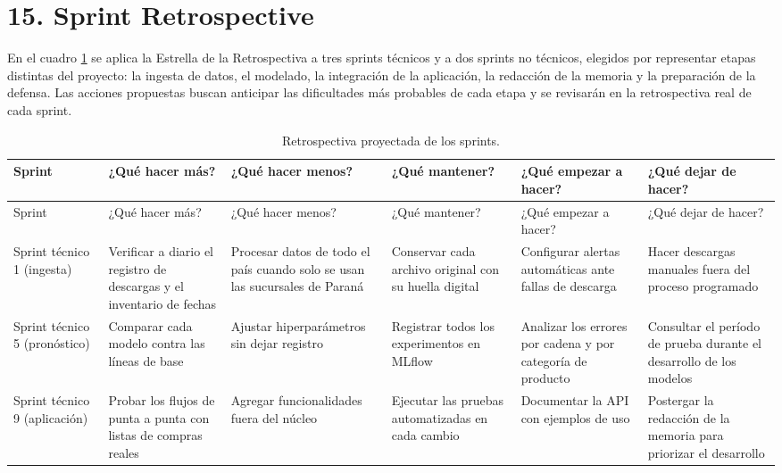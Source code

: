 \documentclass[
11pt, %
]{charter}
\begin{document}
\section{15. Sprint Retrospective}    
\label{sec:sprint_retro}

En el cuadro \ref{tab:retro} se aplica la Estrella de la Retrospectiva a tres sprints técnicos y a dos sprints no técnicos, elegidos por representar etapas distintas del proyecto: la ingesta de datos, el modelado, la integración de la aplicación, la redacción de la memoria y la preparación de la defensa. Las acciones propuestas buscan anticipar las dificultades más probables de cada etapa y se revisarán en la retrospectiva real de cada sprint.

{\small
\begin{longtable}{@{}|>{\raggedright\arraybackslash}p{1.6cm}|>{\raggedright\arraybackslash}p{2.3cm}|>{\raggedright\arraybackslash}p{2.3cm}|>{\raggedright\arraybackslash}p{2.3cm}|>{\raggedright\arraybackslash}p{2.3cm}|>{\raggedright\arraybackslash}p{2.3cm}|@{}}
\caption{Retrospectiva proyectada de los sprints.}
\label{tab:retro}\\
\hline
\rowcolor[HTML]{C0C0C0}
Sprint & ¿Qué hacer más? & ¿Qué hacer menos? & ¿Qué mantener? & ¿Qué empezar a hacer? & ¿Qué dejar de hacer? \\ \hline
\endfirsthead
\hline
\rowcolor[HTML]{C0C0C0}
Sprint & ¿Qué hacer más? & ¿Qué hacer menos? & ¿Qué mantener? & ¿Qué empezar a hacer? & ¿Qué dejar de hacer? \\ \hline
\endhead
Sprint técnico 1 (ingesta) & Verificar a diario el registro de descargas y el inventario de fechas & Procesar datos de todo el país cuando solo se usan las sucursales de Paraná & Conservar cada archivo original con su huella digital & Configurar alertas automáticas ante fallas de descarga & Hacer descargas manuales fuera del proceso programado \\ \hline
Sprint técnico 5 (pronóstico) & Comparar cada modelo contra las líneas de base & Ajustar hiperparámetros sin dejar registro & Registrar todos los experimentos en MLflow & Analizar los errores por cadena y por categoría de producto & Consultar el período de prueba durante el desarrollo de los modelos \\ \hline
Sprint técnico 9 (aplicación) & Probar los flujos de punta a punta con listas de compras reales & Agregar funcionalidades fuera del núcleo & Ejecutar las pruebas automatizadas en cada cambio & Documentar la API con ejemplos de uso & Postergar la redacción de la memoria para priorizar el desarrollo \\ \hline

\end{longtable}}
\end{document}
